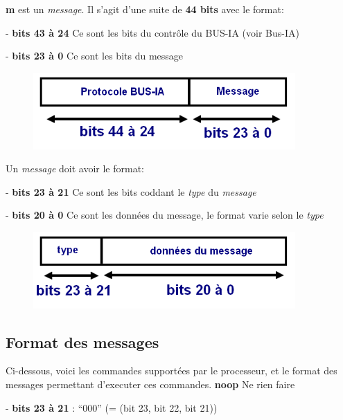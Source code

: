\documentclass[10pt]{article}
\begin{document}
        \textbf{m} est un \textit{message}. Il s'agit d'une suite de \textbf{44 bits} avec le format:
        
        - \textbf{bits 43 à 24} Ce sont les bits du contrôle du BUS-IA (voir Bus-IA)
        
        - \textbf{bits 23 à 0} Ce sont les bits du message

        \begin{figure}[h!]
            \includegraphics[width=10cm]{messages1.png}
        \end{figure}

        Un \textit{message} doit avoir le format:
        
        - \textbf{bits 23 à 21} Ce sont les bits coddant le \textit{type} du \textit{message}
        
        - \textbf{bits 20 à 0} Ce sont les données du message, le format varie selon le \textit{type}
        
        \begin{figure}[h!]
            \includegraphics[width=10cm]{messages2.png}
        \end{figure}
        
        \newpage
        \subsection{Format des messages}\label{formatmsg}
        
        Ci-dessous, voici les commandes supportées par le processeur,
        et le format des messages permettant d'executer ces commandes.
        \newline
        \newline
        \textbf{noop} Ne rien faire
        
        - \textbf{bits 23 à 21} : ``000'' (= (bit 23, bit 22, bit 21))
\end{document}
